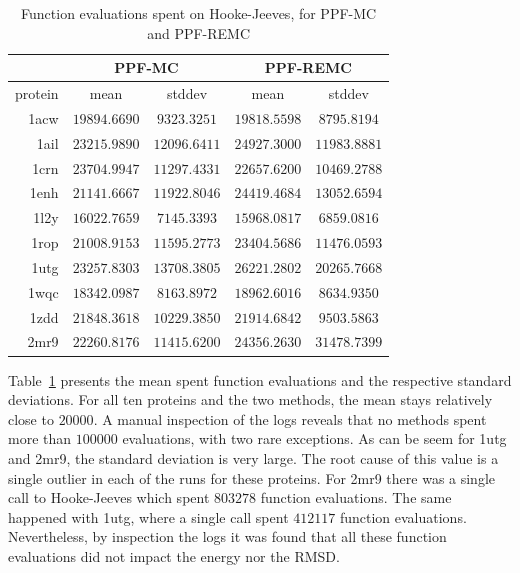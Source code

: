 \begin{table}
  \centering
  \begin{tabular}{r|c|c||c|c}
            & \multicolumn{2}{c}{PPF-MC} & \multicolumn{2}{||c}{PPF-REMC} \\ \hline
    protein & mean         & stddev       & mean         & stddev \\ \hline \hline
    1acw    & $19894.6690$ & $9323.3251$  & $19818.5598$ & $8795.8194$  \\ \hline
    1ail    & $23215.9890$ & $12096.6411$ & $24927.3000$ & $11983.8881$ \\ \hline
    1crn    & $23704.9947$ & $11297.4331$ & $22657.6200$ & $10469.2788$ \\ \hline
    1enh    & $21141.6667$ & $11922.8046$ & $24419.4684$ & $13052.6594$ \\ \hline
    1l2y    & $16022.7659$ & $7145.3393$  & $15968.0817$ & $6859.0816$  \\ \hline
    1rop    & $21008.9153$ & $11595.2773$ & $23404.5686$ & $11476.0593$ \\ \hline
    1utg    & $23257.8303$ & $13708.3805$ & $26221.2802$ & $20265.7668$ \\ \hline
    1wqc    & $18342.0987$ & $8163.8972$  & $18962.6016$ & $8634.9350$  \\ \hline
    1zdd    & $21848.3618$ & $10229.3850$ & $21914.6842$ & $9503.5863$  \\ \hline
    2mr9    & $22260.8176$ & $11415.6200$ & $24356.2630$ & $31478.7399$ \\ \hline
  \end{tabular}
  \caption{Function evaluations spent on Hooke-Jeeves, for PPF-MC and PPF-REMC}
  \label{tab:spent-evals}
\end{table}

Table~\ref{tab:spent-evals} presents the mean spent function evaluations and
the respective standard deviations. For all ten proteins and the two methods,
the mean stays relatively close to $20000$. A manual inspection of the logs
reveals that no methods spent more than $100000$ evaluations, with two rare
exceptions. As can be seem for 1utg and 2mr9, the standard deviation is very
large. The root cause of this value is a single outlier in each of the runs
for these proteins. For 2mr9 there was a single call to Hooke-Jeeves which spent
$803278$ function evaluations. The same happened with 1utg, where a single call
spent $412117$ function evaluations. Nevertheless, by inspection the logs it
was found that all these function evaluations did not impact the energy nor the
RMSD. %

